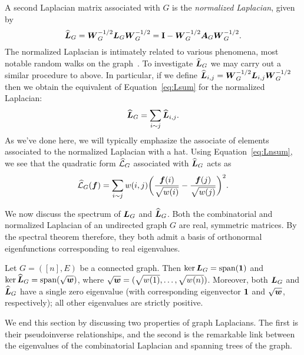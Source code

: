 A second Laplacian matrix associated with $G$ is the \emph{normalized Laplacian}, given by 
\begin{equation}
\label{eq:Ln_G}
    \widehat{\vb*{L}}_G = \vb*{W}_G^{-1/2} \vb*{L}_G\vb*{W}_G^{-1/2} = \vb{I} - \vb*{W}_G^{-1/2} \vb*{A}_G\vb*{W}_{G}^{-1/2}.
\end{equation} 
The normalized Laplacian is intimately related to various  phenomena, most notable random walks on the graph~\cite{chen2007resistance,chung1997spectral}. To investigate $\widehat{\vb*{L}}_G$ we may carry out a similar procedure to above. In particular, if we define $\widehat{\vb*{L}}_{i,j}=\vb*{W}_G^{-1/2} \vb*{L}_{i,j}\vb*{W}_G^{-1/2}$ then we obtain the equivalent of Equation~\eqref{eq:Lsum} for the normalized Laplacian:
\begin{equation}
\label{eq:Lnsum}
    \widehat{\vb*{L}}_G = \sum_{i\sim j}\widehat{\vb*{L}}_{i,j}.
\end{equation}
As we've done here, we will typically emphasize the associate of elements associated to the normalized Laplacian with a hat.
Using Equation~\eqref{eq:Lnsum}, we see that 
the quadratic form $\widehat{\mathcal{L}}_G$ associated with $\widehat{\vb*{L}}_G$ acts as 
\begin{equation}
\label{eq:Lnf}
    \widehat{\mathcal{L}}_G(\vb*{f}) = \sum_{i\sim j} w(i,j)\bigg(\frac{\vb*{f}(i)}{\sqrt{w(i)}}-\frac{\vb*{f}(j)}{\sqrt{w(j)}}\bigg)^2.
\end{equation}

We now discuss  the spectrum of $\vb*{L}_G$ and $\widehat{\vb*{L}}_G$. Both the combinatorial and normalized Laplacian of an undirected graph $G$ are real, symmetric matrices. By the spectral theorem therefore, they both admit a basis of orthonormal eigenfunctions corresponding to real eigenvalues. 

\begin{lemma}
	\label{lem:laplacian_props}
	Let $G=([n],E)$ be a connected graph. Then  $\ker\vb*{L}_G=\textnormal{span}(\vb{1})$ and $\ker\widehat{\vb*{L}}_G=\textnormal{span}(\sqrt{\vb*{w}})$, where $\sqrt{\vb*{w}}=(\sqrt{w(1)},\dots,\sqrt{w(n)})$. Moreover, both  $\vb*{L}_G$ and $\widehat{\vb*{L}}_G$ have a single zero eigenvalue (with corresponding eigenvector $\vb{1}$ and $\sqrt{\vb*{w}}$, respectively); all other eigenvalues are strictly positive. 
\end{lemma}


We  end this section by discussing two properties of graph Laplacians. The first is  their pseudoinverse relationships, and the second is the remarkable link between the eigenvalues of the combinatorial  Laplacian and spanning trees of the graph. 

